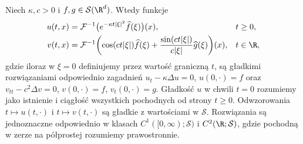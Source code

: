 \begin{twierdzenie}
\label{thm:pde8-evolution}
Niech $\kappa,c>0$ i $f,g\in\mathcal S(\R^d)$.
Wtedy funkcje
\begin{align*}
 u(t,x)&=\mathcal F^{-1}
 \bigl(e^{-\kappa t|\xi|^2}\widehat f(\xi)\bigr)(x),&&t\ge0,\\
 v(t,x)&=\mathcal F^{-1}\biggl(
 \cos(ct|\xi|)\widehat f(\xi)
 +\frac{\sin(ct|\xi|)}{c|\xi|}\widehat g(\xi)
 \biggr)(x),&&t\in\R,
\end{align*}
gdzie iloraz w $\xi=0$ definiujemy przez wartość graniczną $t$,
są gładkimi rozwiązaniami odpowiednio zagadnień
$u_t-\kappa\Delta u=0$, $u(0,\cdot)=f$ oraz
$v_{tt}-c^2\Delta v=0$, $v(0,\cdot)=f$, $v_t(0,\cdot)=g$.
Gładkość $u$ w chwili $t=0$ rozumiemy jako istnienie
i ciągłość wszystkich pochodnych od strony $t\ge0$.
Odwzorowania $t\mapsto u(t,\cdot)$ i $t\mapsto v(t,\cdot)$
są gładkie z wartościami w $\mathcal S$.
Rozwiązania są jednoznaczne odpowiednio w klasach
$C^1([0,\infty);\mathcal S)$ i $C^2(\R;\mathcal S)$,
gdzie pochodną w zerze na półprostej rozumiemy prawostronnie.
\end{twierdzenie}
